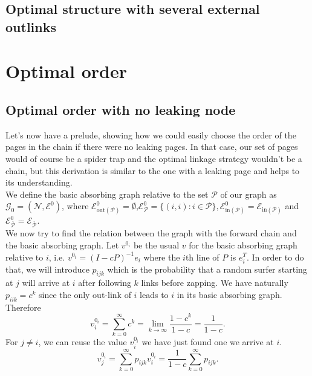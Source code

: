 \documentclass{article}
\newcommand{\1}{\mathbf{1}}
\theoremstyle{definition}
\begin{document}
\subsection{Optimal structure with several external outlinks}


\section{Optimal order}
\subsection{Optimal order with no leaking node}
\label{sec:no_leak}
Let's now have a prelude, showing how we could easily choose the order of the pages in the chain if there were
no leaking pages.
In that case, our set of pages would of course be a spider trap and the optimal linkage strategy wouldn't be a chain, but this derivation is similar
to the one with a leaking page and helps to its understanding.\\
We define the basic absorbing graph relative to the set $\mathcal{P}$ of our graph as $\mathcal{G}_0=(\mathcal{N},\mathcal{E}^0)$, where $\mathcal{E}_{\text{out}(\mathcal{P})}^0 = \emptyset$,$\mathcal{E}^0_{\mathcal{P}}=\{(i,i):i\in \mathcal{P}\},\mathcal{E}_{\text{in}(\mathcal{P})}^0 = \mathcal{E}_{\text{in}(\mathcal{P})}$ and $ \mathcal{E}^0_{\overline{\mathcal{P}}}=\mathcal{E}_{\overline{\mathcal{P}}}$.\\
We now try to find the relation between the graph with the forward chain and the basic absorbing graph.
Let $v^{0_i}$ be the usual $v$ for the basic absorbing graph relative to $i$,
i.e. $v^{0_i} = (I - cP)^{-1}e_i$ where the $i$th line of $P$ is $e_i^T$.
In order to do that, we will introduce $p_{ijk}$ which is the probability that a random surfer starting at $j$
will arrive at $i$ after following $k$ links before zapping.
We have naturally $p_{iik} = c^k$ since the only out-link of $i$ leads to $i$ in its basic absorbing graph.
Therefore
\[ v_i^{0_i} = \sum_{k=0}^\infty c^k = \lim_{k \to \infty} \frac{1-c^k}{1-c} = \frac{1}{1-c}. \]
For $j \neq i$, we can reuse the value $v_i^{0_i}$ we have just found one we arrive at $i$.
\[ v_j^{0_i} = \sum_{k=0}^\infty p_{ijk} v_i^{0_i} = \frac{1}{1-c} \sum_{k=0}^\infty p_{ijk}. \]
\end{document}
